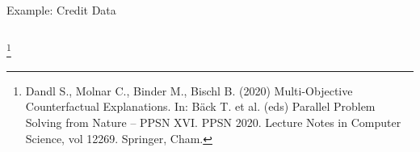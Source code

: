 \documentclass[11pt,compress,t,notes=noshow, aspectratio=169, xcolor=table]{beamer}
\begin{document}
\begin{frame}{Example: Credit Data}
\begin{columns}
\begin{column}{0.5\textwidth}
		\end{column}
	\end{columns}
\footnote[frame]{Dandl S., Molnar C., Binder M., Bischl B. (2020) Multi-Objective Counterfactual Explanations. In: Bäck T. et al. (eds) Parallel Problem Solving from Nature – PPSN XVI. PPSN 2020. Lecture Notes in Computer Science, vol 12269. Springer, Cham.}
\end{frame}


%		
%				
%		
%		
\end{document}
